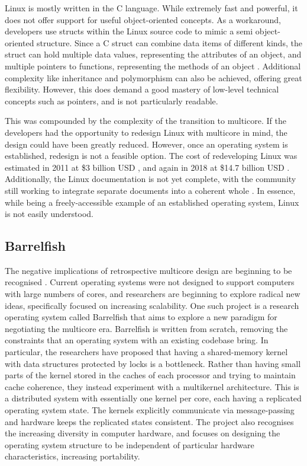 \documentclass[bsc,frontabs,singlespacing,parskip,deptreport]{infthesis}     %
\begin{document}
Linux is mostly written in the C language. While extremely fast and powerful, it does not offer support for useful object-oriented concepts. As a workaround, developers use structs within the Linux source code to mimic a semi object-oriented structure. Since a C struct can combine data items of different kinds, the struct can hold multiple data values, representing the attributes of an object, and multiple pointers to functions, representing the methods of an object \cite{c-struct}. Additional complexity like inheritance and polymorphism can also be achieved, offering great flexibility. However, this does demand a good mastery of low-level technical concepts such as pointers, and is not particularly readable. 

This was compounded by the complexity of the transition to multicore. If the developers had the opportunity to redesign Linux with multicore in mind, the design could have been greatly reduced. However, once an operating system is established, redesign is not a feasible option. The cost of redeveloping Linux was estimated in 2011 at \$3 billion USD \cite{linux-kernel-cost}, and again in 2018 at \$14.7 billion USD \cite{cost-to-redev}. Additionally, the Linux documentation is not yet complete, with the community still working to integrate separate documents into a coherent whole \cite{linux-docs}. In essence, while being a freely-accessible example of an established operating system, Linux is not easily understood.

\subsection{Barrelfish}
The negative implications of retrospective multicore design are beginning to be recognised \cite{barrelfish-article}. Current operating systems were not designed to support computers with large numbers of cores, and researchers are beginning to explore radical new ideas, specifically focused on increasing scalability. One such project is a research operating system called Barrelfish \cite{barrelfish-website} that aims to explore a new paradigm for negotiating the multicore era. Barrelfish is written from scratch, removing the constraints that an operating system with an existing codebase bring. In particular, the researchers have proposed that having a shared-memory kernel with data structures protected by locks is a bottleneck. Rather than having small parts of the kernel stored in the caches of each processor and trying to maintain cache coherence, they instead experiment with a multikernel architecture. This is a distributed system with essentially one kernel per core, each having a replicated operating system state. The kernels explicitly communicate via message-passing and hardware keeps the replicated states consistent. The project also recognises the increasing diversity in computer hardware, and focuses on designing the operating system structure to be independent of particular hardware characteristics, increasing portability. 
\end{document}
